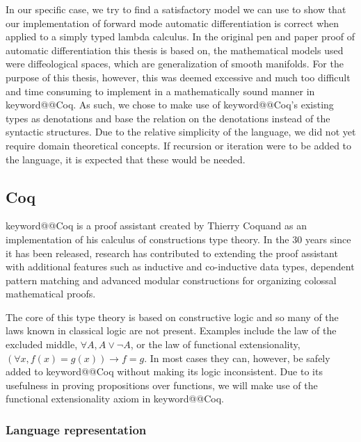 \documentclass[12pt, final]{article}
\makeatletter
\def\<#1>{\csname keyword@@#1\endcsname}
\makeatother
\begin{document}
In our specific case, we try to find a satisfactory model we can use to show that our implementation of forward mode automatic differentiation is correct when applied to a simply typed lambda calculus.
In the original pen and paper proof of automatic differentiation this thesis is based on, the mathematical models used were diffeological spaces, which are generalization of smooth manifolds.
For the purpose of this thesis, however, this was deemed excessive and much too difficult and time consuming to implement in a mathematically sound manner in \<Coq>.
As such, we chose to make use of \<Coq>'s existing types as denotations and base the relation on the denotations instead of the syntactic structures.
Due to the relative simplicity of the language, we did not yet require domain theoretical concepts. If recursion or iteration were to be added to the language, it is expected that these would be needed.


\subsection{Coq}

\<Coq> is a proof assistant created by Thierry Coquand as an implementation of his calculus of constructions type theory\cite{Coquand1988}.
In the 30 years since it has been released, research has contributed to extending the proof assistant with additional features such as inductive and co-inductive data types\cite{Coquand1990}, dependent pattern matching\cite{Sozeau2010} and advanced modular constructions for organizing colossal mathematical proofs\cite{Sozeau2008}\cite{Mahboubi2013}.

The core of this type theory is based on constructive logic and so many of the laws known in classical logic are not present.
Examples include the law of the excluded middle, $\forall A, A \vee \neg A$, or the law of functional extensionality, $(\forall x, f(x) = g(x)) \rightarrow f = g$.
In most cases they can, however, be safely added to \<Coq> without making its logic inconsistent.
Due to its usefulness in proving propositions over functions, we will make use of the functional extensionality axiom in \<Coq>.

\subsubsection{Language representation}
\label{sec:language_repr}
\end{document}
